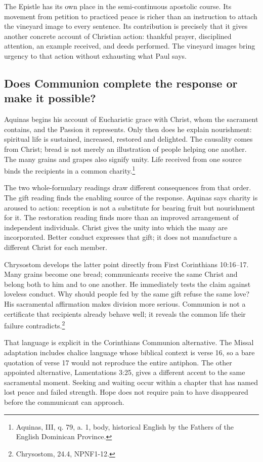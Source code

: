 The Epistle has its own place in the semi-continuous apostolic course. Its movement from petition to practiced peace is richer than an instruction to attach the vineyard image to every sentence. Its contribution is precisely that it gives another concrete account of Christian action: thankful prayer, disciplined attention, an example received, and deeds performed. The vineyard images bring urgency to that action without exhausting what Paul says.

\subsection{Does Communion complete the response or make it possible?}
Aquinas begins his account of Eucharistic grace with Christ, whom the sacrament contains, and the Passion it represents. Only then does he explain nourishment: spiritual life is sustained, increased, restored and delighted. The causality comes from Christ; bread is not merely an illustration of people helping one another. The many grains and grapes also signify unity. Life received from one source binds the recipients in a common charity.\footnote{Aquinas,  III, q. 79, a. 1, body, historical English by the Fathers of the English Dominican Province.}

The two whole-formulary readings draw different consequences from that order. The gift reading finds the enabling source of the response. Aquinas says charity is aroused to action: reception is not a substitute for bearing fruit but nourishment for it. The restoration reading finds more than an improved arrangement of independent individuals. Christ gives the unity into which the many are incorporated. Better conduct expresses that gift; it does not manufacture a different Christ for each member.

Chrysostom develops the latter point directly from First Corinthians 10:16--17. Many grains become one bread; communicants receive the same Christ and belong both to him and to one another. He immediately tests the claim against loveless conduct. Why should people fed by the same gift refuse the same love? His sacramental affirmation makes division more serious. Communion is not a certificate that recipients already behave well; it reveals the common life their failure contradicts.\footnote{Chrysostom,  24.4, NPNF1-12.}

That language is explicit in the Corinthians Communion alternative. The Missal adaptation includes chalice language whose biblical context is verse 16, so a bare quotation of verse 17 would not reproduce the entire antiphon. The other appointed alternative, Lamentations 3:25, gives a different accent to the same sacramental moment. Seeking and waiting occur within a chapter that has named lost peace and failed strength. Hope does not require pain to have disappeared before the communicant can approach.


